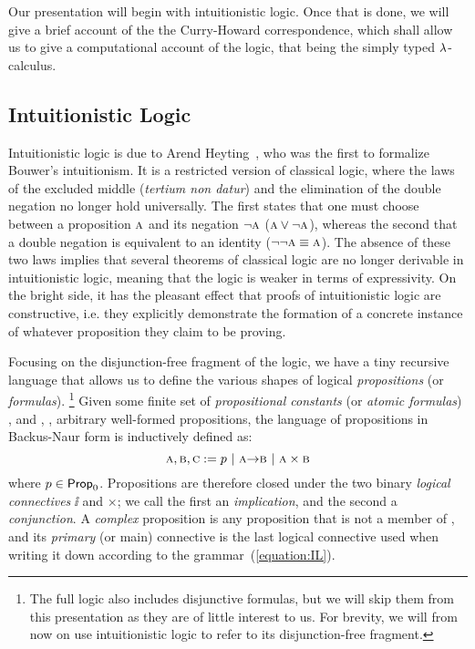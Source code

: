 Our presentation will begin with intuitionistic logic. 
Once that is done, we will give a brief account of the the Curry-Howard correspondence, which shall allow us to give a computational account of the logic, that being the simply typed $\mathnormal{\lambda}$-calculus.

\subsection{Intuitionistic Logic}
\label{subsection:intuitionistic_logic}
Intuitionistic logic is due to Arend Heyting~\cite{heyting1930}, who was the first to formalize Bouwer's intuitionism.
It is a restricted version of classical logic, where the laws of the excluded middle (\textit{tertium non datur}) and the elimination of the double negation no longer hold universally.
The first states that one must choose between a proposition $\prop{a}$ and its negation $\neg \prop{a}$ ($\prop{a} \vee \neg \prop{a}$), whereas the second that a double negation is equivalent to an identity ($\neg \neg \prop{a} \equiv \prop{a}$).
The absence of these two laws implies that several theorems of classical logic are no longer derivable in intuitionistic logic, meaning that the logic is weaker in terms of expressivity.
On the bright side, it has the pleasant effect that proofs of intuitionistic logic are constructive, i.e. they explicitly demonstrate the formation of a concrete instance of whatever proposition they claim to be proving.

Focusing on the disjunction-free fragment of the logic, we have a tiny recursive language that allows us to define the various shapes of logical \textit{propositions} (or \textit{formulas}).%
\footnote{The full logic also includes disjunctive formulas, but we will skip them from this presentation as they are of little interest to us. For brevity, we will from now on use intuitionistic logic to refer to its disjunction-free fragment.}
Given some finite set of \textit{propositional constants} (or \textit{atomic formulas}) \propcon{}, and , ,  arbitrary well-formed propositions, the language of propositions in Backus-Naur form is inductively defined as:
\begin{equation}
\prop{a}, \prop{b}, \prop{c} := p \ | \ \prop{a} \ii \prop{b} \ | \ \prop{a} \times \prop{b} 
\label{equation:IL}
\end{equation}
where $p \in \mathsf{Prop}_0{}$.
Propositions are therefore closed under the two binary \textit{logical connectives} $\ii$ and $\times$; we call the first an \textit{implication}, and the second a \textit{conjunction}. 
A \textit{complex} proposition is any proposition that is not a member of \propcon{}, and its \textit{primary} (or main) connective is the last logical connective used when writing it down according to the grammar~(\ref{equation:IL}).

